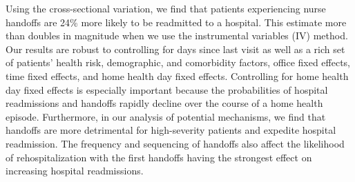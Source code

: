 \documentclass[final,12pt, notitlepage]{article}
\begin{document}
Using the cross-sectional variation,
we find that patients experiencing nurse handoffs are 24\% more likely to be readmitted to a hospital.
This estimate more than doubles in magnitude when we use the instrumental variables (IV) method.
Our results are robust to controlling for days since last visit as well as a rich set of patients' health risk, demographic, and comorbidity factors, office fixed effects, time fixed effects, and home health day fixed effects.
Controlling for home health day fixed effects is especially important because the probabilities of hospital readmissions and handoffs rapidly decline over the course of a home health episode.
Furthermore, in our analysis of potential mechanisms, we find that handoffs are more detrimental for high-severity patients and expedite hospital readmission. The frequency and sequencing of handoffs also affect the likelihood of rehospitalization with the first handoffs having the strongest effect on increasing hospital readmissions.


\end{document}
